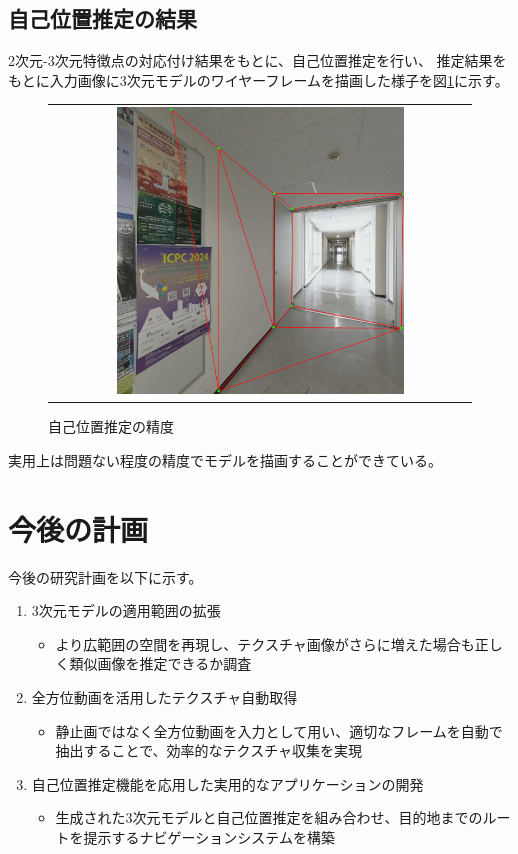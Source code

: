 \documentclass[]{jarticle}          %
\begin{document}
\subsection{自己位置推定の結果}
2次元-3次元特徴点の対応付け結果をもとに、自己位置推定を行い、
推定結果をもとに入力画像に3次元モデルのワイヤーフレームを描画した様子を図\ref{eight}に示す。
\begin{figure}[H]
  \begin{center}
    \begin{tabular}{c}
      \includegraphics[width=0.7\textwidth]{figures/result.png}\\
    \end{tabular}
  \end{center}
  \caption{自己位置推定の精度}
  \label{eight}
\end{figure}
実用上は問題ない程度の精度でモデルを描画することができている。
\section{今後の計画}
今後の研究計画を以下に示す。
\begin{enumerate}
  \item 3次元モデルの適用範囲の拡張
  \begin{itemize}
    \item より広範囲の空間を再現し、テクスチャ画像がさらに増えた場合も正しく類似画像を推定できるか調査
  \end{itemize}
  \item 全方位動画を活用したテクスチャ自動取得
  \begin{itemize}
    \item 静止画ではなく全方位動画を入力として用い、適切なフレームを自動で抽出することで、効率的なテクスチャ収集を実現
  \end{itemize}
  \item 自己位置推定機能を応用した実用的なアプリケーションの開発
  \begin{itemize}
    \item 生成された3次元モデルと自己位置推定を組み合わせ、目的地までのルートを提示するナビゲーションシステムを構築
  \end{itemize}
\end{enumerate}
\end{document}
